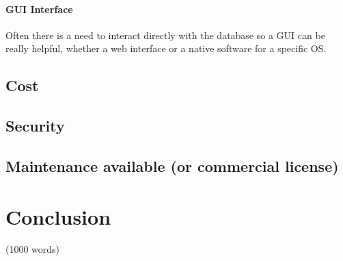 \documentclass[11]{article}
\begin{document}
	\paragraph{GUI Interface \\}
	Often there is a need to interact directly with the database so a GUI can be really helpful, whether a web interface or a native software for a specific OS.



	\subsection*{Cost}
	
	\subsection*{Security}

	\subsection*{Maintenance available (or commercial license)}



\section*{Conclusion}(1000 words)


\pagebreak



\end{document}
